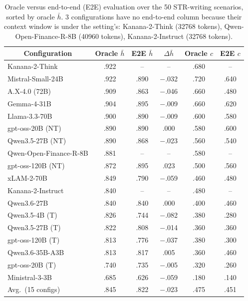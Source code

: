 \begin{table}[t]
\centering
\footnotesize
\caption{Oracle versus end-to-end (E2E) evaluation over the 50 STR-writing scenarios, sorted by oracle $\bar{h}$. 3 configurations have no end-to-end column because their context window is under the setting's: Kanana-2-Think (32768 tokens), Qwen-Open-Finance-R-8B (40960 tokens), Kanana-2-Instruct (32768 tokens).}
\label{tab:e2e_full}
\begin{tabular}{lccccc}
\toprule
\multicolumn{1}{c}{\textbf{Configuration}} & \textbf{Oracle $\bar{h}$} & \textbf{E2E $\bar{h}$} & \textbf{$\Delta\bar{h}$} & \textbf{Oracle $c$} & \textbf{E2E $c$} \\
\midrule
Kanana-2-Think & .922 & -- & -- & .680 & -- \\
Mistral-Small-24B & .922 & .890 & $-$.032 & .720 & .640 \\
A.X-4.0 (72B) & .909 & .863 & $-$.046 & .660 & .480 \\
Gemma-4-31B & .904 & .895 & $-$.009 & .660 & .620 \\
Llama-3.3-70B & .900 & .890 & $-$.009 & .600 & .580 \\
gpt-oss-20B (NT) & .890 & .890 & .000 & .580 & .600 \\
Qwen3.5-27B (NT) & .890 & .868 & $-$.023 & .560 & .540 \\
Qwen-Open-Finance-R-8B & .881 & -- & -- & .580 & -- \\
gpt-oss-120B (NT) & .872 & .895 & .023 & .500 & .560 \\
xLAM-2-70B & .849 & .790 & $-$.059 & .460 & .480 \\
Kanana-2-Instruct & .840 & -- & -- & .480 & -- \\
Qwen3.6-27B & .840 & .840 & .000 & .400 & .460 \\
Qwen3.5-4B (T) & .826 & .744 & $-$.082 & .380 & .280 \\
Qwen3.5-27B (T) & .822 & .808 & $-$.014 & .360 & .360 \\
gpt-oss-120B (T) & .813 & .776 & $-$.037 & .380 & .300 \\
Qwen3.6-35B-A3B & .813 & .817 & .005 & .360 & .460 \\
gpt-oss-20B (T) & .740 & .735 & $-$.005 & .320 & .260 \\
Ministral-3-3B & .685 & .626 & $-$.059 & .180 & .140 \\
\midrule
Avg.\ (15 configs) & .845 & .822 & $-$.023 & .475 & .451 \\
\bottomrule
\end{tabular}
\end{table}
